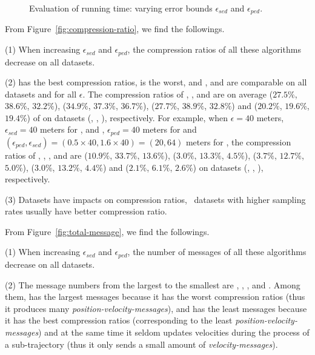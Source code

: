 {{\begin{figure}[tb!]
	\vspace{-2ex}
	\caption{\small Evaluation of running time: varying error bounds $\epsilon_{sed}$ and $\epsilon_{ped}$.}
	\label{fig:running-time}
	\vspace{-1ex}
\end{figure}


 From Figure~\ref{fig:compression-ratio}, we find the followings.

\ni (1) When increasing $\epsilon_{sed}$ and $\epsilon_{ped}$, the compression ratios of all these algorithms decrease on all datasets.

\ni (2) \sitt has the best compression ratios, \ldrh is the worst, and \grts, \citt and \bitt are comparable on all datasets and for all $\epsilon$.
The compression ratios of \grts, \bitt,  \citt and \sitt are on average {($27.5\%$, $38.6\%$, $32.2\%$), ($34.9\%$, $37.3\%$, $36.7\%$), ($27.7\%$, $38.9\%$, $32.8\%$) and ($20.2\%$, $19.6\%$, $19.4\%$)} of \ldrh on datasets (\mopsi, \sercar, \geolife), respectively.
For example, when $\epsilon = 40$ meters, \ie~$\epsilon_{sed} = 40$ meters for \ldrh, \grts and \citt, $\epsilon_{ped} = 40$ meters for \sitt and {$(\epsilon_{ped}, \epsilon_{sed}) = (0.5\times 40, 1.6\times 40)=(20, 64)$} meters for \bitt, the compression ratios of \ldrh, \grts, \bitt, \citt and \sitt are
{($10.9\%$, $33.7\%$, $13.6\%$), ($3.0\%$, $13.3\%$, $4.5\%$), {($3.7\%$, $12.7\%$, $5.0\%$)}, ($3.0\%$, $13.2\%$, $4.4\%$) and ($2.1\%$, $6.1\%$, $2.6\%$)} on  {datasets (\mopsi, \sercar, \geolife)}, respectively. 

\ni (3) Datasets have impacts on compression ratios, \ie~datasets with higher sampling rates usually have better compression ratio.
	


 From Figure~\ref{fig:total-message}, we find the followings.


\ni (1) When increasing $\epsilon_{sed}$ and $\epsilon_{ped}$, the number of messages of all these algorithms decrease on all datasets.

\ni (2) The message numbers from the largest to the smallest are \ldrh, \grts, \citt, \bitt and \sitt. Among them, \ldrh has the largest messages because it has the worst compression ratios (thus it produces many \emph{position-velocity-messages}), and \sitt has the least messages because it has the best compression ratios (corresponding to the least \emph{position-velocity-messages}) and at the same time it seldom updates velocities during the process of a sub-trajectory (thus it only sends a small amount of \emph{velocity-messages}).

}}
